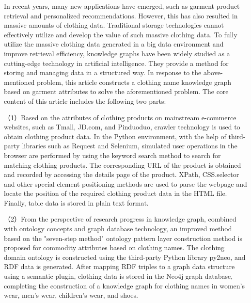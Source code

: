 \enabstract

In recent years, many new applications have emerged, such as garment product retrieval and personalized recommendations. However, this has also resulted in massive amounts of clothing data. Traditional storage technologies cannot effectively utilize and develop the value of such massive clothing data. To fully utilize the massive clothing data generated in a big data environment and improve retrieval efficiency, knowledge graphs have been widely studied as a cutting-edge technology in artificial intelligence. They provide a method for storing and managing data in a structured way. In response to the above-mentioned problem, this article constructs a clothing name knowledge graph based on garment attributes to solve the aforementioned problem. The core content of this article includes the following two parts:

（1）Based on the attributes of clothing products on mainstream e-commerce websites, such as Tmall, JD.com, and Pinduoduo, crawler technology is used to obtain clothing product data. In the Python environment, with the help of third-party libraries such as Request and Selenium, simulated user operations in the browser are performed by using the keyword search method to search for matching clothing products. The corresponding URL of the product is obtained and recorded by accessing the details page of the product. XPath, CSS.selector and other special element positioning methods are used to parse the webpage and locate the position of the required clothing product data in the HTML file. Finally, table data is stored in plain text format.

（2）From the perspective of research progress in knowledge graph, combined with ontology concepts and graph database technology, an improved method based on the "seven-step method" ontology pattern layer construction method is proposed for commodity attributes based on clothing names. The clothing domain ontology is constructed using the third-party Python library py2neo, and RDF data is generated. After mapping RDF triples to a graph data structure using a semantic plugin, clothing data is stored in the Neo4j graph database, completing the construction of a knowledge graph for clothing names in women's wear, men's wear, children's wear, and shoes.

